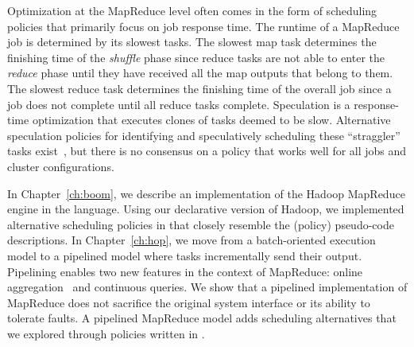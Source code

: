 Optimization at the MapReduce level often comes in the form of scheduling
policies that primarily focus on job response time.  The runtime of a MapReduce
job is determined by its slowest tasks.  The slowest map task determines the
finishing time of the {\em shuffle} phase since reduce tasks are not able to
enter the {\em reduce} phase until they have received all the map outputs that
belong to them.  The slowest reduce task determines the finishing time of the
overall job since a job does not complete until all reduce tasks complete.
Speculation is a response-time optimization that executes clones of tasks
deemed to be slow.  Alternative speculation policies for identifying and
speculatively scheduling these ``straggler'' tasks exist~\cite{mapreduce-osdi,
zaharia-late}, but there is no consensus on a policy that works well for all
jobs and cluster configurations.

In Chapter~\ref{ch:boom}, we describe an implementation of the Hadoop MapReduce
engine in the \OVERLOG language.  Using our declarative version of Hadoop, we
implemented alternative scheduling policies in \OVERLOG that closely resemble
the (policy) pseudo-code descriptions.  In Chapter~\ref{ch:hop}, we move from a
batch-oriented execution model to a pipelined model where tasks incrementally
send their output.  Pipelining enables two new features in the context of
MapReduce: online aggregation~\cite{onlineagg} and continuous queries.  We show
that a pipelined implementation of MapReduce does not sacrifice the original
system interface or its ability to tolerate faults.  A pipelined MapReduce
model adds scheduling alternatives that we explored through policies written in
\OVERLOG.

